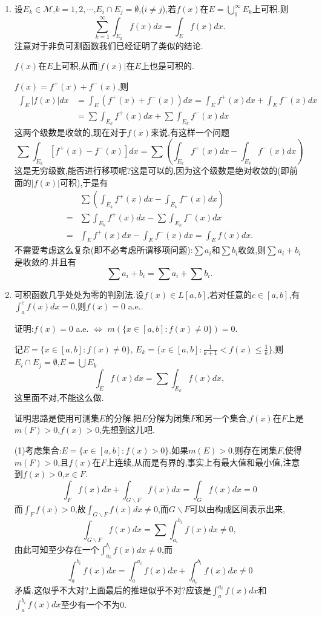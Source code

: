 \documentclass[12pt,a4paper,openany]{book}
\begin{document}
\begin{enumerate}
\item 设$E_k \in \mathcal{M}$,$k=1,2,\cdots$,$E_i \cap E_j = \emptyset$,($i \neq j$),若$f(x)$在$E = \bigcup_{1}^{\infty}{E_k}$上可积.则
\[
\sum_{k=1}^{\infty}{\int_{E_k}{f(x)dx}} = \int_{E}{f(x)dx}.
\]
注意对于非负可测函数我们已经证明了类似的结论.

$f(x)$在$E$上可积,从而$|f(x)|$在$E$上也是可积的.

$f(x)=f^+(x)+f^-(x)$,则
\[
\begin{aligned}
\int_{E}{|f(x)|dx} &= \int_{E}{(f^+(x) + f^-(x))dx} = \int_{E}{f^+(x)dx} + \int_{E}{f^-(x)dx} \\
&= \sum{\int_{E_k}{f^+(x)dx}} + \sum{\int_{E_k}{f^-(x)dx}}
\end{aligned}
\]
这两个级数是收敛的,现在对于$f(x)$来说,有这样一个问题
\[
\sum{\int_{E_k}{[f^+(x)-f^-(x)]dx}} = \sum{(\int_{E_k}{f^+(x)dx} - \int_{E_k}{f^-(x)dx})}
\]
这是无穷级数,能否进行移项呢?这是可以的,因为这个级数是绝对收敛的(即前面的$|f(x)|$可积),于是有
\[
\begin{aligned}
&\sum{(\int_{E_k}{f^+(x)dx} - \int_{E_k}{f^-(x)dx})} \\
=&\sum{\int_{E_k}{f^+(x)dx}} - \sum{\int_{E_k}{f^-(x)dx}} \\
=&\int_{E}{f^+(x)dx} - \int_{E}{f^-(x)dx} = \int_{E}{f(x)dx}.
\end{aligned}
\]
不需要考虑这么复杂(即不必考虑所谓移项问题):$\sum{a_i}$和$\sum{b_i}$收敛,则$\sum{a_i+b_i}$是收敛的.并且有
\[
\sum{a_i+b_i} = \sum{a_i} + \sum{b_i}.
\]

\item 可积函数几乎处处为零的判别法.设$f(x) \in L[a,b]$,若对任意的$c \in [a,b]$,有$\int_{a}^{c}{f(x)dx}=0$,则$f(x)=0$ a.e..

证明:$f(x)=0$ a.e. $\Leftrightarrow$ $m(\{x \in [a,b] : f(x) \neq 0\})=0$.

记$E = \{x \in [a,b]: f(x) \neq 0\}$, $E_k = \{ x \in [a,b] : \frac{1}{k+1} < f(x) \le \frac{1}{k}\}$,则$E_i \cap E_j = \emptyset$,$E=\bigcup{E_k}$
\[
\int_{E}{f(x)dx} = \sum{\int_{E_k}{f(x)dx}},
\]
这里面不对,不能这么做.

证明思路是使用可测集$E$的分解.把$E$分解为闭集$F$和另一个集合,$f(x)$在$F$上是$m(F)>0$,$f(x)>0$,先想到这儿吧.

(1)考虑集合:$E = \{x \in [a,b]: f(x)>0\}$.如果$m(E)>0$,则存在闭集$F$,使得$m(F)>0$,且$f(x)$在$F$上连续,从而是有界的,事实上有最大值和最小值,注意到$f(x)>0$,$x \in F$.
\[
\int_{F}{f(x)dx} + \int_{G \backslash F}{f(x)dx} = \int_{G}{f(x)dx} = 0
\]
而$\int_{F}{f(x)}>0$,故$\int_{G \backslash F}{f(x)dx} \neq 0$,而$G \backslash F$可以由构成区间表示出来,
\[
\int_{G \backslash F}{f(x)dx} = \sum{\int_{a_i}^{b_i}{f(x)dx}} \neq 0,
\]
由此可知至少存在一个$\int_{a_i}^{b_i}{f(x)dx} \neq 0$,而
\[
\int_{a}^{b_i}{f(x)dx} = \int_{a}^{a_i}{f(x)dx} + \int_{a_i}^{b_i}{f(x)dx} \neq 0
\]
矛盾.这似乎不大对?上面最后的推理似乎不对?应该是$\int_{a}^{a_i}{f(x)dx}$和$\int_{a}^{b_i}{f(x)dx}$至少有一个不为0.


\end{enumerate}
\end{document}
